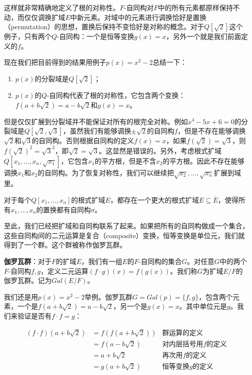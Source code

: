 \documentclass{article}
\begin{document}
这样就非常精确地定义了根的对称性。$F$-自同构对$F$中的所有元素都原样保持不动，而仅仅调换扩域$E$中新元素。对域中的元素进行调换恰好是置换（permutation）的思想，置换后保持不变恰好是对称的概念。对于$Q[\sqrt{2}]$这个例子，只有两个$Q$-自同构：一个是恒等变换$g(x) = x$，另外一个就是我们前面定义的$f$。

现在我们把目前得到的结果用例子$p(x) = x^2 - 2$总结一下：

\begin{enumerate}
\item $p(x)$的分裂域是$Q[\sqrt{2}]$；
\item $p(x)$的$Q$-自同构代表了根的对称性，它包含两个变换：$f(a + b\sqrt{2}) = a - b\sqrt{2}$和$g(x) = x$。
\end{enumerate}

但是仅仅扩展到分裂域并不能保证对所有的根完全对称。例如$x^4 - 5x + 6 = 0$的分裂域是$Q[\sqrt{2}, \sqrt{3}]$，虽然我们有能够调换$\pm \sqrt{2}$的自同构$f$，但是不存在能够调换$\sqrt{2}$和$\sqrt{3}$的自同构。否则根据自同构的定义$f(x) = x$，如果$f(\sqrt{2}) = \sqrt{3}$，则$f(\sqrt{2})^2 = \sqrt{3}^2$，即$\sqrt{2} = \sqrt{3}$。这显然是错误的。另外，考虑根式扩域$Q[x_1, ..., x_n, \sqrt{x_1}]$，它包含$x_1$的平方根，但是不含$x_2$的平方根。因此不存在能够调换$x_1$和$x_2$的自同构。为了恢复对称性，我们可以继续把$\sqrt{x_2}, ..., \sqrt{x_n}$扩展到域里。

\begin{theorem}
对于每个$Q[x_1, ..., x_n]$的根式扩域$E$，都存在一个更大的根式扩域$E \subseteq \overline{E}$，使得所有$x_1, ..., x_n$的置换都有自同构$\sigma$。
\end{theorem}

至此，我们已经把扩域和自同构联系了起来。如果把所有的自同构做成一个集合，这些自同构间的二元运算是复合（composite）变换，恒等变换是单位元，我们就得到了一个群。这个群被称作伽罗瓦群。

\begin{definition}
\textbf{伽罗瓦群}：对于$F$的扩域$E$，我们有一组$E$的$F$-自同构的集合$G$。对任意$G$中的两个$F$-自同构$f, g$，定义二元运算$(f \cdot g)(x) = f(g(x))$。我们称$G$为扩域$E/F$的伽罗瓦群。记为$Gal(E/F)$。
\end{definition}

我们还是用$p(x) = x^2 - 2$举例。伽罗瓦群$G = Gal(p) = \{f, g\}$，包含两个元素，一个是$f(a + b\sqrt{2}) = a - b\sqrt{2}$，另一个是$g(x) = x$。其中单位元是$g$。我们来验证是否有$f \cdot f = g$：

\[
\begin{array}{rll}
(f \cdot f)(a + b\sqrt{2}) & = f(f(a + b\sqrt{2})) & \text{群运算的定义} \\
  & = f(a - b\sqrt{2}) & \text{对内层括号用$f$的定义} \\
  & = a + b\sqrt{2} & \text{再次用$f$的定义} \\
  & = g(a + b\sqrt{2}) & \text{恒等变换$g$的定义}
\end{array}
\]
\end{document}
